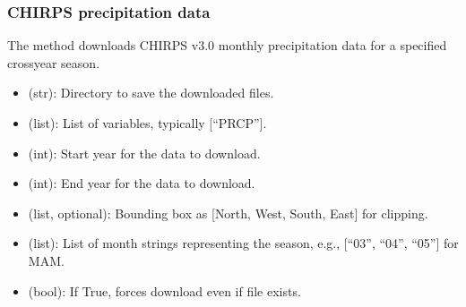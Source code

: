 \documentclass[letterpaper,10pt,english]{sphinxmanual}
\begin{document}
\begin{sphinxVerbatim}[commandchars=\\\{\}]
 

  
    \PYG{p}{[}\PYG{p}{]}
    \PYG{p}{[}   \PYG{p}{]}
\end{sphinxVerbatim}


\subsubsection{CHIRPS precipitation data}
\label{\detokenize{Download:chirps-precipitation-data}}
\sphinxAtStartPar
The  method downloads CHIRPS v3.0 monthly precipitation data for a specified cross\sphinxhyphen{}year season.

\sphinxAtStartPar
{}
\begin{itemize}
\item {} 
\sphinxAtStartPar
{} (str): Directory to save the downloaded files.

\item {} 
\sphinxAtStartPar
{} (list): List of variables, typically {[}“PRCP”{]}.

\item {} 
\sphinxAtStartPar
{} (int): Start year for the data to download.

\item {} 
\sphinxAtStartPar
{} (int): End year for the data to download.

\item {} 
\sphinxAtStartPar
{} (list, optional): Bounding box as {[}North, West, South, East{]} for clipping.

\item {} 
\sphinxAtStartPar
{} (list): List of month strings representing the season, e.g., {[}“03”, “04”, “05”{]} for MAM.

\item {} 
\sphinxAtStartPar
{} (bool): If True, forces download even if file exists.

\end{itemize}
\end{document}
